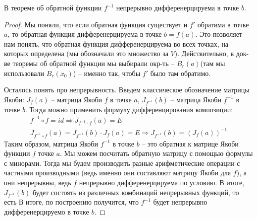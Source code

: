 \begin{follow}
    В теореме об обратной функции $f^{-1}$ непрерывно дифференерцируема в точке $b$.
\end{follow}
\begin{proof}
    Мы поняли, что если обратная функция существует и $f'$ обратима в точке $a$, то обратная функция дифференерцируема в точке $b = f(a)$.
    Это позволяет нам понять, что обратная функция дифференерцируема во всех точках, на которых определена (мы обозначали это множество за $V$).
    Действительно, в док-ве теоремы об обратной функции мы выбирали окр-ть -- $B_r(a)$(там мы использовали $B_r(x_0)$) -- именно так, чтобы $f'$ было там обратимо.
    
    \quad Осталось понять про непрерывность. 
    Введем классическое обозначение матрицы Якоби: $J_f(a)$ -- матрица Якоби $f$ в точке $a$, $J_{f^{-1}}(b)$ -- матрица Якоби $f^{-1}$ в точке $b$.
    Тогда можно применить формулу дифференцирования композиции:
    \begin{gather*}
        f^{-1} \circ f = id \Rightarrow J_{f^{-1} \circ f}(a) = E \\
        J_{f^{-1} \circ f}(a) = J_{f^{-1}}(b) \cdot J_f(a) = E \Rightarrow J_{f^{-1}}(b) = (J_f(a))^{-1} 
    \end{gather*}
    \quad Таким образом, матрица Якоби $f^{-1}$ в точке $b$ -- это обратная к матрице Якоби функции $f$ точке $a$.
    Мы можем посчитать обратную матрицу с помощью формулы с минорами.
    Тогда мы будем производить разные арифметические операции с частными производными (ведь именно они составляют матрицу Якоби для $f$), а они непрерывны, ведь $f$ непрерывно дифференерцируема по условию.
    В итоге, $J_{f^{-1}}(b)$ будет состоять из различных комбинаций непрерывных функций, то есть  
    В итоге, по построению получится, что $f^{-1}$ будет непрерывно дифференерцируемо в точке $b$.
    
\end{proof}

\begin{follow}
    
\end{follow}